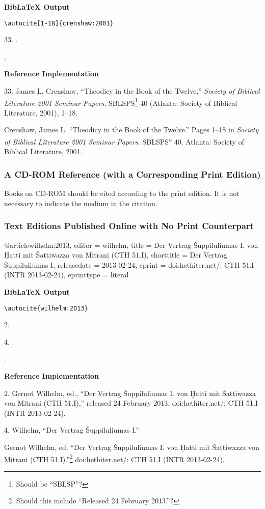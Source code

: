 \documentclass[a4paper]{article}
\newcommand\citetestns[3]{%
  {\textbf{BibLaTeX Output}\par
   \nobreak
   \texttt{\textbackslash autocite[#2]\{#3\}}\par
   \color{biblatex-colour}
   #1. \cite[#2]{#3}.\par
   \hangindent\bibindent\bibentrycite{#3}.\par}}
\newcommand\citetestnp[3]{%
  {\textbf{BibLaTeX Output}\par
   \nobreak
   \texttt{\textbackslash autocite\{#3\}}\par
   \color{biblatex-colour}
   #1. \cite{#3}.\par
   #2. \cite{#3}.\par
   \hangindent\bibindent\bibentrycite{#3}.\par}}
\newenvironment{refimp}{%
  \begin{minipage}{\linewidth}
    \setlength{\parskip}{1ex}
    \textbf{Reference Implementation}\par
    \nobreak
    \color{reference-colour}
}{\end{minipage}}
\newenvironment{vb}{%
  \setlength{\parskip}{0pt}
  \verbatim}{\endverbatim}
\begin{document}
\citetestns{33}{1-18}{crenshaw:2001}

\begin{refimp}
  33. James L. Crenshaw, “Theodicy in the Book of the Twelve,” \emph{Society
  of Biblical Literature 2001 Seminar Papers,} SBLSPS\footnote{Should be
  “SBLSP”?} 40 (Atlanta: Society of Biblical Literature, 2001), 1–18.
  
  \hangindent\bibindent Crenshaw, James L. “Theodicy in the Book of the
  Twelve.” Pages 1–18 in \emph{Society of Biblical Literature 2001 Seminar
  Papers.} SBLSPS\textsuperscript{\emph{a}} 40. Atlanta: Society of Biblical
  Literature, 2001.
\end{refimp}

\subsubsection{A CD-ROM Reference (with a Corresponding Print Edition)}

Books on CD-ROM should be cited according to the print edition. It is not
necessary to indicate the medium in the citation.

\subsubsection{Text Editions Published Online with No Print Counterpart}

\begin{vb}
@article{wilhelm:2013,
  editor = wilhelm,
  title = {Der Vertrag Šuppiluliumas I. von Ḫatti mit
           Šattiwazza von Mitrani (CTH 51.I)},
  shorttitle = {Der Vertrag Šuppiluliumas I},
  releasedate = {2013-02-24},
  eprint = {doi:hethiter.net/: CTH 51.I (INTR 2013-02-24)},
  eprinttype = {literal}
}
\end{vb}

\citetestnp{2}{4}{wilhelm:2013}

\begin{refimp}
  2. Gernot Wilhelm, ed., “Der Vertrag Šuppiluliumas I. von Ḫatti mit
  Šattiwazza von Mitrani (CTH 51.I),” released 24 February 2013,
  doi:hethiter.net/: CTH 51.I (INTR 2013-02-24).

  4. Wilhelm, “Der Vertrag Šuppiluliumas I.”

  \hangindent\bibindent Gernot Wilhelm, ed. “Der Vertrag Šuppiluliumas I. von
  Ḫatti mit Šattiwazza von Mitrani (CTH 51.I).”\footnote{Should this include
  “Released 24 February 2013.”?} doi:hethiter.net/: CTH 51.I
  (INTR 2013-02-24).
\end{refimp}
\end{document}
